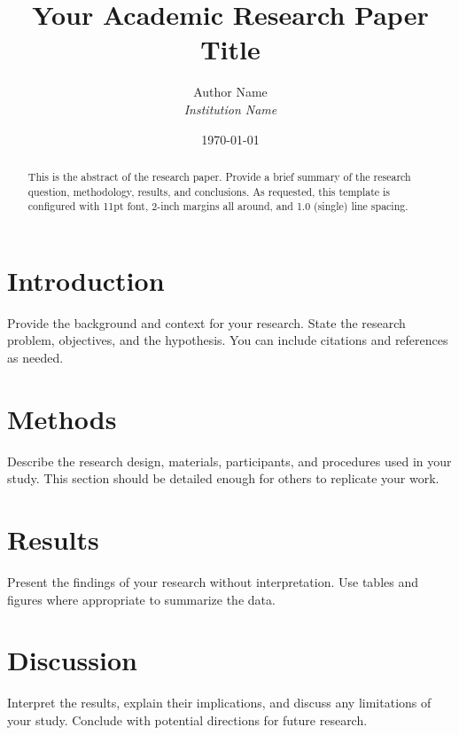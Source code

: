 \documentclass[11pt]{article}
\title{Your Academic Research Paper Title}
\author{Author Name \\ \textit{Institution Name}}
\date{\today}
\begin{document}
\maketitle

\begin{abstract}
This is the abstract of the research paper. Provide a brief summary of the research question, methodology, results, and conclusions. As requested, this template is configured with 11pt font, 2-inch margins all around, and 1.0 (single) line spacing.
\end{abstract}

\section{Introduction}
Provide the background and context for your research. State the research problem, objectives, and the hypothesis. You can include citations and references as needed.

\section{Methods}
Describe the research design, materials, participants, and procedures used in your study. This section should be detailed enough for others to replicate your work. 

\section{Results}
Present the findings of your research without interpretation. Use tables and figures where appropriate to summarize the data. 

\section{Discussion}
Interpret the results, explain their implications, and discuss any limitations of your study. Conclude with potential directions for future research.
\end{document}
